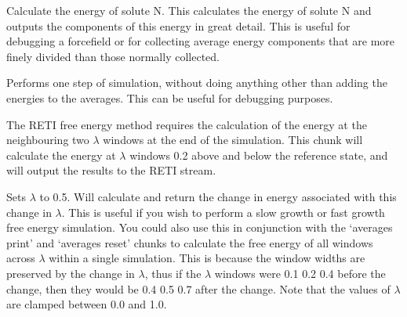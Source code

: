 \documentclass[letterpaper,10pt,english]{sphinxmanual}
\begin{document}
\ignorespaces 
\def\sphinxLiteralBlockLabel{\label{\detokenize{protoms:index-83}}}
%
\begin{sphinxVerbatim}[commandchars=\\\{\}]
  
\end{sphinxVerbatim}

Calculate the energy of solute N. This calculates the energy of solute N and outputs the components of this energy in great detail. This is useful for debugging a forcefield or for collecting average energy components that are more finely divided than those normally collected.

\ignorespaces 
\def\sphinxLiteralBlockLabel{\label{\detokenize{protoms:index-84}}}
%
\begin{sphinxVerbatim}[commandchars=\\\{\}]
 
\end{sphinxVerbatim}

Performs one step of simulation, without doing anything other than adding the energies to the averages. This can be useful for debugging purposes.

\ignorespaces 
\def\sphinxLiteralBlockLabel{\label{\detokenize{protoms:index-85}}}
%
\begin{sphinxVerbatim}[commandchars=\\\{\}]
  
\end{sphinxVerbatim}

The RETI free energy method requires the calculation of the energy at the neighbouring two \(\lambda\) windows at the end of the simulation. This chunk will calculate the energy at \(\lambda\) windows 0.2 above and below the reference state, and will output the results to the RETI stream.

\ignorespaces 
\def\sphinxLiteralBlockLabel{\label{\detokenize{protoms:index-86}}}
%
\begin{sphinxVerbatim}[commandchars=\\\{\}]
  
\end{sphinxVerbatim}

Sets \(\lambda\) to 0.5. Will calculate and return the change in energy associated with this change in \(\lambda\). This is useful if you wish to perform a slow growth or fast growth free energy simulation. You could also use this in conjunction with the ‘averages print’ and ‘averages reset’ chunks to calculate the free energy of all windows across \(\lambda\) within a single simulation. This is because the window widths are preserved by the change in \(\lambda\), thus if the \(\lambda\) windows were 0.1 0.2 0.4 before the change, then they would be 0.4 0.5 0.7 after the change. Note that the values of \(\lambda\) are clamped between 0.0 and 1.0.
\end{document}
